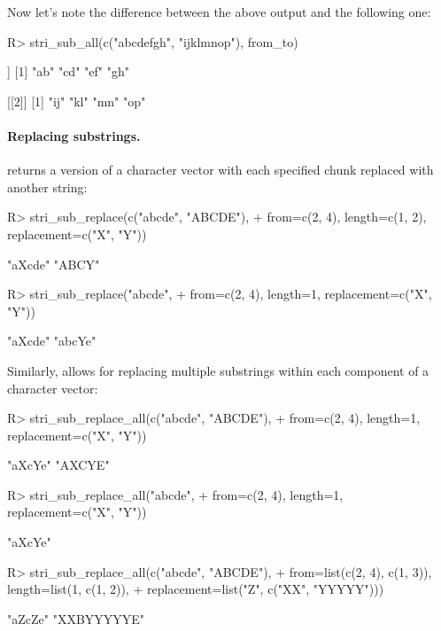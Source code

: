 \documentclass[nojss]{jss}
\begin{document}
\noindent
Now let's note the difference between the above output and the following one:

\begin{Schunk}
\begin{Sinput}
R> stri_sub_all(c("abcdefgh", "ijklmnop"), from_to)
\end{Sinput}
\begin{Soutput}
[[1]]
[1] "ab" "cd" "ef" "gh"

[[2]]
[1] "ij" "kl" "mn" "op"
\end{Soutput}
\end{Schunk}




\paragraph{Replacing substrings.}
 returns a version
of a character vector with each specified chunk replaced with another
string:

\begin{Schunk}
\begin{Sinput}
R> stri_sub_replace(c("abcde", "ABCDE"),
+    from=c(2, 4), length=c(1, 2), replacement=c("X", "Y"))
\end{Sinput}
\begin{Soutput}
[1] "aXcde" "ABCY"
\end{Soutput}
\begin{Sinput}
R> stri_sub_replace("abcde",
+    from=c(2, 4), length=1, replacement=c("X", "Y"))
\end{Sinput}
\begin{Soutput}
[1] "aXcde" "abcYe"
\end{Soutput}
\end{Schunk}

\noindent
Similarly,  allows for replacing
multiple substrings within each component of a character vector:

\begin{Schunk}
\begin{Sinput}
R> stri_sub_replace_all(c("abcde", "ABCDE"),
+    from=c(2, 4), length=1, replacement=c("X", "Y"))
\end{Sinput}
\begin{Soutput}
[1] "aXcYe" "AXCYE"
\end{Soutput}
\begin{Sinput}
R> stri_sub_replace_all("abcde",
+    from=c(2, 4), length=1, replacement=c("X", "Y"))
\end{Sinput}
\begin{Soutput}
[1] "aXcYe"
\end{Soutput}
\begin{Sinput}
R> stri_sub_replace_all(c("abcde", "ABCDE"),
+    from=list(c(2, 4), c(1, 3)), length=list(1, c(1, 2)),
+    replacement=list("Z", c("XX", "YYYYY")))
\end{Sinput}
\begin{Soutput}
[1] "aZcZe"     "XXBYYYYYE"
\end{Soutput}
\end{Schunk}
\end{document}

